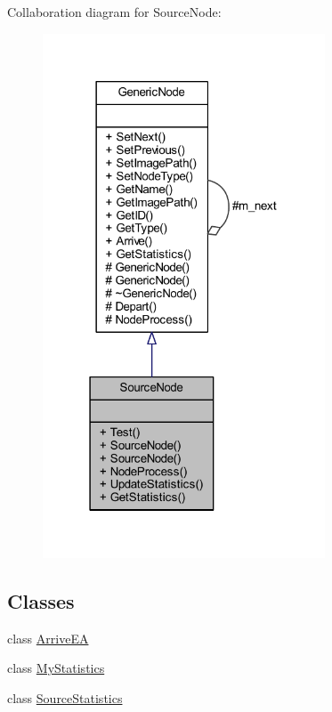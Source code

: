 Collaboration diagram for Source\+Node\+:
\nopagebreak
\begin{figure}[H]
\begin{center}
\leavevmode
\includegraphics[width=238pt]{class_source_node__coll__graph}
\end{center}
\end{figure}
\subsection*{Classes}
\begin{DoxyCompactItemize}
\item 
class \hyperlink{class_source_node_1_1_arrive_e_a}{Arrive\+EA}
\item 
class \hyperlink{class_source_node_1_1_my_statistics}{My\+Statistics}
\item 
class \hyperlink{class_source_node_1_1_source_statistics}{Source\+Statistics}
\end{DoxyCompactItemize}
